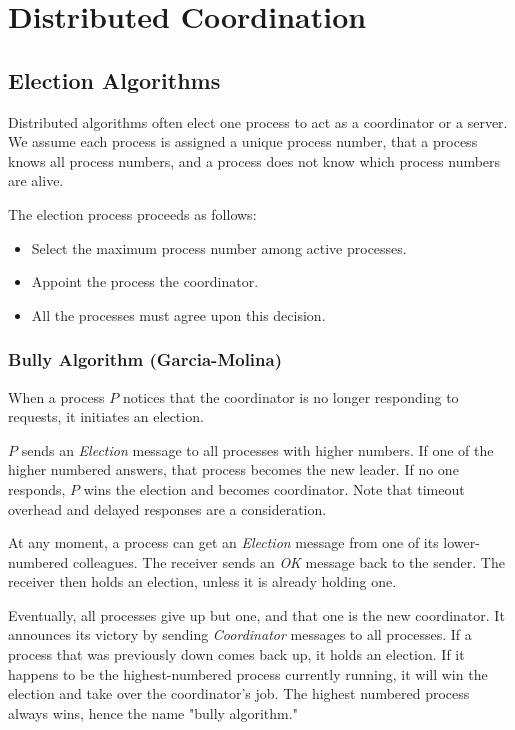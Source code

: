 \chapter{Distributed Coordination}
\section{Election Algorithms}
Distributed algorithms often elect one process to act as a coordinator or a server. We assume each process is assigned a unique process number, that a process knows all process numbers, and a process does not know which process numbers are alive.

The election process proceeds as follows: \begin{itemize}
\item Select the maximum process number among active processes.
\item Appoint the process the coordinator.  
\item All the processes must agree upon this decision. 
\end{itemize}

\subsection{Bully Algorithm (Garcia-Molina)}
When a process $P$ notices that the coordinator is no longer responding to requests, it initiates an election. 

$P$ sends an \textit{Election} message to all processes with higher numbers. If one of the higher numbered answers, that process becomes the new leader. If no one responds, $P$ wins the election and becomes coordinator. Note that timeout overhead and delayed responses are a consideration.

At any moment, a process can get an \textit{Election} message from one of its lower-numbered colleagues. The receiver sends an \textit{OK} message back to the sender. The receiver then holds an election, unless it is already holding one. 

Eventually, all processes give up but one, and that one is the new coordinator. It announces its victory by sending \textit{Coordinator} messages to all processes. If a process that was previously down comes back up, it holds an election. If it happens to be the highest-numbered process currently running, it will win the election and take over the coordinator's job.  The highest numbered process always wins, hence the name "bully algorithm." 


